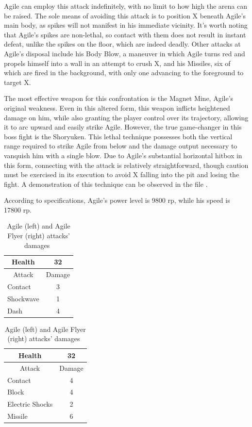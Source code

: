  Agile can employ this attack indefinitely, with no limit to how high the arena can be raised. The sole means of avoiding this attack is to position X beneath Agile's main body, as spikes will not manifest in his immediate vicinity. It's worth noting that Agile's spikes are non-lethal, so contact with them does not result in instant defeat, unlike the spikes on the floor, which are indeed deadly. Other attacks at Agile's disposal include his Body Blow, a maneuver in which Agile turns red and propels himself into a wall in an attempt to crush X, and his Missiles, six of which are fired in the background, with only one advancing to the foreground to target X.

The most effective weapon for this confrontation is the Magnet Mine, Agile's original weakness. Even in this altered form, this weapon inflicts heightened damage on him, while also granting the player control over its trajectory, allowing it to arc upward and easily strike Agile. However, the true game-changer in this boss fight is the Shoryuken. This lethal technique possesses both the vertical range required to strike Agile from below and the damage output necessary to vanquish him with a single blow. Due to Agile's substantial horizontal hitbox in this form, connecting with the attack is relatively straightforward, though caution must be exercised in its execution to avoid X falling into the pit and losing the fight. A demonstration of this technique can be observed in the file .

According to specifications, Agile's power level is 9800 rp, while his speed is 17800 rp.

\begin{table}[htp]
	\begin{minipage}{.45\linewidth}
		\centering
		\begin{tabular}[h]{l c }
			\toprule
			\multicolumn{1}{c}{Health}  & 32 \\
			\midrule
			\multicolumn{1}{c}{Attack} & \multicolumn{1}{c}{Damage}\\
			Contact & 3\\
			Shockwave& 1\\
			Dash& 4\\
			\bottomrule
		\end{tabular}
	\end{minipage}
	\begin{minipage}{.45\linewidth}
		\centering
		\begin{tabular}[h]{l c }
			\toprule
			\multicolumn{1}{c}{Health}  & 32 \\
			\midrule
			\multicolumn{1}{c}{Attack} & \multicolumn{1}{c}{Damage}\\
			Contact & 4 \\
			Block & 4\\
			Electric Shocks & 2\\
			Missile& 6\\
			\bottomrule
		\end{tabular}
	\end{minipage}
	\caption{Agile (left) and Agile Flyer (right) attacks' damages~\cite{wiki:Agile}}
\end{table}

